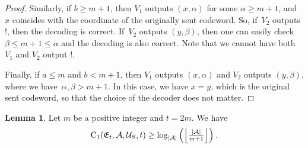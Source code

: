 \documentclass[11pt,a4paper]{article}
\theoremstyle{definition}
\newtheorem{lemma}[theorem]{Lemma}
\newcommand{\mA}{\mathcal{A}}
\newcommand{\mU}{\mathcal{U}}
\newcommand{\CC}{\textnormal{C}}
\begin{document}
\begin{proof}
Similarly, if $b\ge m+1$, then $V_1$ outputs $(x,\alpha)$ for some $\alpha \ge m+1$, and $x$ coincides with the coordinate of the originally sent codeword. So, if~$V_2$ outputs $!$, then the decoding is correct. If~$V_2$ outputs $(y,\beta)$, then one can easily check $\beta\le m+1 \le \alpha$ and the decoding is also correct. Note that we cannot have  
both $V_1$ and $V_2$ output $!$.

Finally, if $a \le m$ and $b<m+1$, then $V_1$ outputs $(x,\alpha)$ and $V_2$ outputs $(y,\beta)$, where we have~$\alpha,\beta>m+1$. In this case, we have $x=y$, which is the original sent codeword, so that the choice of the decoder does not matter.
\end{proof}


\begin{lemma}
\label{lemma2}
Let $m$ be a positive integer and $t=2m $. We have $$\CC_1(\mathfrak{E}_t,\mA,\mU_S,t) \ge \log_{|\mA|}\left(\left\lfloor\tfrac{|\mathcal{A}|}{m+1}\right\rfloor\right).$$
\end{lemma}
\end{document}
